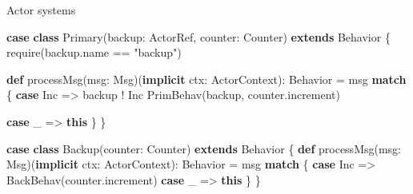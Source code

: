 \documentclass[
  ignorenonframetext,
]{beamer}
\newenvironment{Shaded}{}{}
\newcommand{\FunctionTok}[1]{\textcolor[rgb]{0.02,0.16,0.49}{#1}}
\newcommand{\KeywordTok}[1]{\textcolor[rgb]{0.00,0.44,0.13}{\textbf{#1}}}
\newcommand{\NormalTok}[1]{#1}
\newcommand{\StringTok}[1]{\textcolor[rgb]{0.25,0.44,0.63}{#1}}
\begin{document}
\begin{frame}[fragile]

\begin{block}{Actor systems}

\begin{Shaded}
\begin{Highlighting}[]
\KeywordTok{case} \KeywordTok{class} \FunctionTok{Primary}\NormalTok{(backup: ActorRef, counter: Counter) }\KeywordTok{extends}\NormalTok{ Behavior \{}
  \FunctionTok{require}\NormalTok{(backup.}\FunctionTok{name}\NormalTok{ == }\StringTok{"backup"}\NormalTok{)}

  \KeywordTok{def} \FunctionTok{processMsg}\NormalTok{(msg: Msg)(}\KeywordTok{implicit}\NormalTok{ ctx: ActorContext): Behavior =}
\NormalTok{    msg }\KeywordTok{match}\NormalTok{ \{}
      \KeywordTok{case}\NormalTok{ Inc =>}
\NormalTok{        backup ! Inc}
        \FunctionTok{PrimBehav}\NormalTok{(backup, counter.}\FunctionTok{increment}\NormalTok{)}

      \KeywordTok{case}\NormalTok{ _ => }\KeywordTok{this}
\NormalTok{    \}}
\NormalTok{\}}
\end{Highlighting}
\end{Shaded}

\end{block}

\end{frame}

\begin{frame}[fragile]

\begin{Shaded}
\begin{Highlighting}[]
\KeywordTok{case} \KeywordTok{class} \FunctionTok{Backup}\NormalTok{(counter: Counter) }\KeywordTok{extends}\NormalTok{ Behavior \{}
  \KeywordTok{def} \FunctionTok{processMsg}\NormalTok{(msg: Msg)(}\KeywordTok{implicit}\NormalTok{ ctx: ActorContext): Behavior = msg }\KeywordTok{match}\NormalTok{ \{}
    \KeywordTok{case}\NormalTok{ Inc => }\FunctionTok{BackBehav}\NormalTok{(counter.}\FunctionTok{increment}\NormalTok{)}
    \KeywordTok{case}\NormalTok{ _ => }\KeywordTok{this}
\NormalTok{  \}}
\NormalTok{\}}
\end{Highlighting}
\end{Shaded}

\end{frame}
\end{document}
